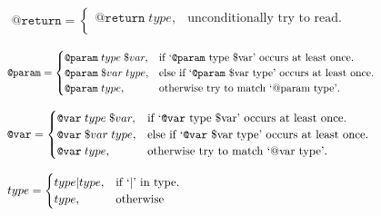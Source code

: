 \documentclass[a4paper,10pt,oneside]{report}
\begin{document}
\begin{equation}
  \begin{aligned}
  \texttt{@return}=\begin{cases}
    \texttt{@return} \; type, & \text{unconditionally try to read}.\\
  \end{cases}
  \end{aligned}
  \phantom{\hspace{8cm}} %
\end{equation}

\begin{equation}
  \begin{aligned}
  \texttt{@param}=\begin{cases}
    \texttt{@param} \; type \; \$var, & \text{if `\texttt{@param} type \$var' occurs at least once}.\\
    \texttt{@param} \; \$var \; type, & \text{else if `\texttt{@param} \$var type' occurs at least once}.\\
    \texttt{@param} \; type, & \text{otherwise try to match `@param type'}.\\
  \end{cases}
  \end{aligned}
  \phantom{\hspace{2.9cm}} %
\end{equation}

\begin{equation}
  \begin{aligned}
  \texttt{@var}=\begin{cases}
    \texttt{@var} \; type \; \$var, & \text{if `\texttt{@var} type \$var' occurs at least once}.\\
    \texttt{@var} \; \$var \; type, & \text{else if `\texttt{@var} \$var type' occurs at least once}.\\
    \texttt{@var} \; type, & \text{otherwise try to match `@var type'}.\\
  \end{cases}
  \end{aligned}
  \phantom{\hspace{2.83cm}} %
\end{equation}

\begin{equation}
  \begin{aligned}
  type=\begin{cases}
    type|type, & \text{if `$\vert$' in type}.\\
    type, & \text{otherwise}
  \end{cases}
  \end{aligned}
  \phantom{\hspace{8.48cm}} %
\end{equation}
\end{document}
